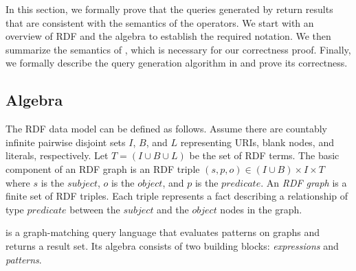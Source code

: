 
In this section, we formally prove that the \sparql queries generated by \rdfframes return results that are consistent with the semantics of the \rdfframes operators.
We start with an overview of RDF and the \sparql algebra to establish the required notation.
We then summarize the semantics of \sparql, which is necessary for our correctness proof. Finally, we formally describe the query generation algorithm in \rdfframes and prove its correctness.


\subsection{\sparql Algebra}

The RDF data model can be defined as follows.
Assume there are countably infinite pairwise disjoint
sets $I$, $B$, and $L$ representing URIs, blank nodes, and literals, respectively. Let $T = (I \cup B \cup L)$ be the set of RDF terms. The basic component of an RDF graph is an RDF triple $(s,p,o) \in (I \cup B) \times I \times T $ where $s$ is the $subject$, $o$ is the $object$, and $p$ is the $predicate$.  An \textit{RDF graph} is a finite set of RDF triples.
Each triple represents a fact describing a relationship of type $predicate$ between the $subject$ and the $object$ nodes in the graph.

\sparql is a graph-matching query language that evaluates patterns on graphs and returns a result set. Its algebra consists of two
building blocks: \textit{expressions} and \textit{patterns}.

